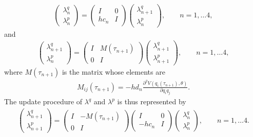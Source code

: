\begin{align}
  \left(
    \begin{array}{c}
      \lambda^q_{n} \\
      \lambda^p_{n}
    \end{array}
  \right)
  =
  \left(
    \begin{array}{cc}
      I &  0  \\
      hc_n &  I
    \end{array}
  \right)
  \left(
    \begin{array}{c}
      \lambda^q_{n+1} \\
      \lambda^p_{n}
    \end{array}
  \right),\qquad n = 1, \ldots 4,
\end{align}
and
\begin{align}
  \left(
    \begin{array}{c}
      \lambda^q_{n+1} \\
      \lambda^p_{n}
    \end{array}
  \right)
  =
  \left(
    \begin{array}{cc}
      I &  M(\tau_{n+1})  \\
      0 &  I
    \end{array}
  \right)
  \left(
    \begin{array}{c}
      \lambda^q_{n+1} \\
      \lambda^p_{n+1}
    \end{array}
  \right),\qquad n = 1, \ldots 4,
\end{align}
where $M(\tau_{n+1})$ is the matrix whose elements are
\begin{align}
  M_{ij}(\tau_{n+1}) = -hd_n\frac{\partial^2 V(q_i(\tau_{n+1}),\theta)}{\partial q_i q_j}.
\end{align}
The update procedure of $\lambda^q$ and $\lambda^p$ is thus represented by
\begin{align}
  \left(
    \begin{array}{c}
      \lambda^q_{n+1} \\
      \lambda^p_{n+1}
    \end{array}
  \right)
  =
  \left(
    \begin{array}{cc}
      I &  -M(\tau_{n+1})  \\
      0 &  I
    \end{array}
  \right)
  \left(
    \begin{array}{cc}
      I &  0  \\
      -hc_n &  I
    \end{array}
  \right)
  \left(
    \begin{array}{c}
      \lambda^q_{n} \\
      \lambda^p_{n}
    \end{array}
  \right), \qquad n = 1, \ldots 4.
  \label{eq:algorithm_adjoint_symplectic}
\end{align}
